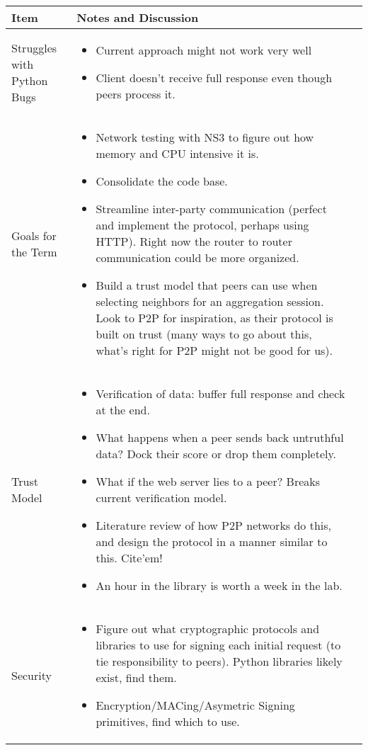 \documentclass[a4wide,10pt]{extarticle}
\begin{document}
\vspace{0.5cm}
\begin{center}
\begin{tabular}{| m{3.0cm} | m{12.6cm} | m{2cm}|} \hline
\textbf{Item} & \textbf{Notes and Discussion}\\ \hline

Struggles with Python Bugs & 
	\begin{itemize}
		\item Current approach might not work very well
		\item Client doesn't receive full response even though peers process it.
	\end{itemize} 
\\ \hline

Goals for the Term &
	\begin{itemize}
		\item Network testing with NS3 to figure out how memory and CPU intensive it is.
		\item Consolidate the code base.
		\item Streamline inter-party communication (perfect and implement the protocol, perhaps using HTTP). Right now the router to router communication could be more organized.
		\item Build a trust model that peers can use when selecting neighbors for an aggregation session. Look to P2P for inspiration, as their protocol is built on trust (many ways to go about this, what's right for P2P might not be good for us).
	\end{itemize}
\\ \hline

Trust Model &
	\begin{itemize}
		\item Verification of data: buffer full response and check at the end.
		\item What happens when a peer sends back untruthful data? Dock their score or drop them completely.
		\item What if the web server lies to a peer? Breaks current verification model.
		\item Literature review of how P2P networks do this, and design the protocol in a manner similar to this. Cite'em!
		\item An hour in the library is worth a week in the lab.

	\end{itemize}
\\ \hline

Security &
	\begin{itemize}
		\item Figure out what cryptographic protocols and libraries to use for signing each initial request (to tie responsibility to peers). Python libraries likely exist, find them.
		\item Encryption/MACing/Asymetric Signing primitives, find which to use.
	\end{itemize}
\\ \hline


\end{tabular}
\end{center}
\end{document}
